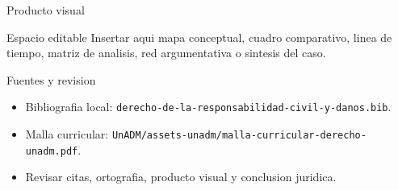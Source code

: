 \documentclass[
  spanish,
  aspectratio=169,
  xcolor={dvipsnames,table}
]{beamer}
\begin{document}
\begin{frame}{Producto visual}
  \begin{block}{Espacio editable}
    Insertar aqui mapa conceptual, cuadro comparativo, linea de tiempo,
    matriz de analisis, red argumentativa o sintesis del caso.
  \end{block}
  \centering
\end{frame}

\begin{frame}{Fuentes y revision}
  \begin{itemize}
    \item Bibliografia local: \texttt{derecho-de-la-responsabilidad-civil-y-danos.bib}.
    \item Malla curricular: \texttt{UnADM/assets-unadm/malla-curricular-derecho-unadm.pdf}.
    \item Revisar citas, ortografia, producto visual y conclusion juridica.
  \end{itemize}
\end{frame}
\end{document}
